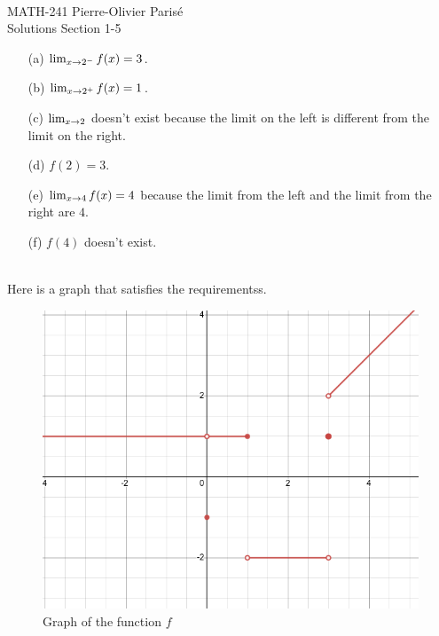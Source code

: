 


	\noindent \hrulefill \\
	MATH-241 \hfill Pierre-Olivier Paris{\'e}\\
	Solutions Section 1-5 \hfill \semester \\\vspace*{-1cm}
	
	\noindent\hrulefill
	
	\spc
	
	
	\begin{enumerate}
	\item[(a)] $\lim_{x \rightarrow 2^-} f(x) = 3$.
	\item[(b)] $\lim_{x \rightarrow 2^+} f(x) = 1$.
	\item[(c)] $\lim_{x \rightarrow 2}$ doesn't exist because the limit on the left is different from the limit on the right.
	\item[(d)] $f(2) = 3$.
	\item[(e)] $\lim_{x \rightarrow 4} f(x) = 4$ because the limit from the left and the limit from the right are $4$.
	\item[(f)] $f(4)$ doesn't exist. 
	\end{enumerate}
	
	\spc
	
	\\
	Here is a graph that satisfies the requirementss.
	
	\begin{figure}[h!]
	\centering
	\includegraphics[scale=0.5]{fig_1.png}
	\caption{Graph of the function $f$}
	\end{figure}
	
